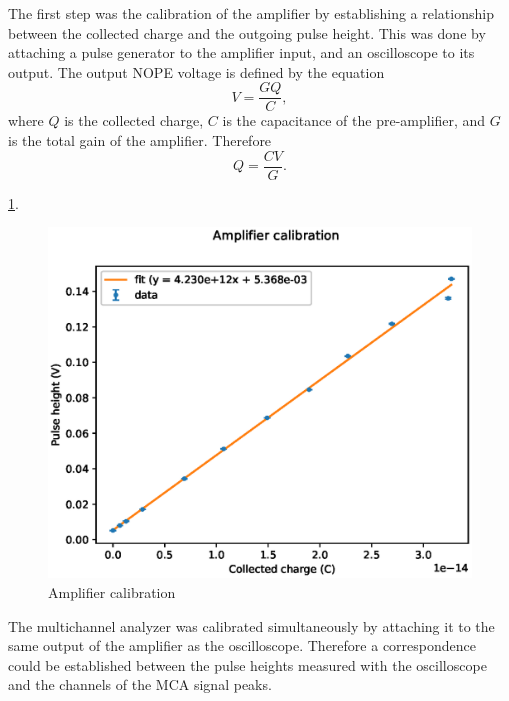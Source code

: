 \documentclass[a4paper]{article}
\begin{document}
The first step was the calibration of the amplifier by establishing a relationship between the collected charge and the outgoing pulse height.
This was done by attaching a pulse generator to the amplifier input, and an oscilloscope to its output.
The output NOPE voltage is defined by the equation
\begin{equation}
V = \frac{GQ}{C},
\end{equation}
where $Q$ is the collected charge, $C$ is the capacitance of the pre-amplifier, and $G$ is the total gain of the amplifier.
Therefore 
\begin{equation}
Q = \frac{CV}{G}.
\end{equation}

\ref{fig:amp_calibration}.

\begin{figure}[ht!]
\centering
\includegraphics[width=\textwidth]{fig/python/amp_calibration.eps}
\caption{Amplifier calibration}
\label{fig:amp_calibration}
\end{figure}

The multichannel analyzer was calibrated simultaneously by attaching it to the same output of the amplifier as the oscilloscope.
Therefore a correspondence could be established between the pulse heights measured with the oscilloscope and the channels of the MCA signal peaks. 
\end{document}
